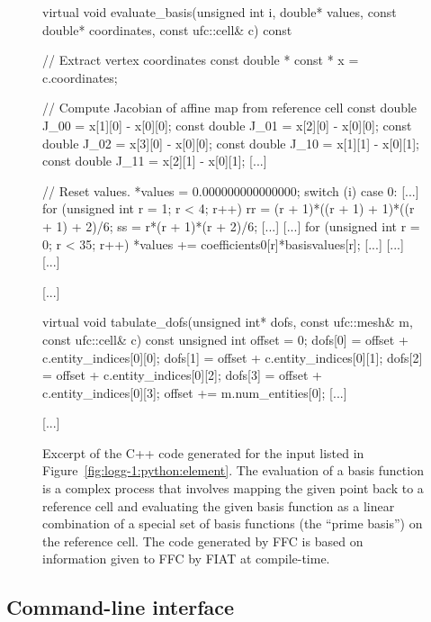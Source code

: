 \begin{figure}
  \begin{c++}
virtual void evaluate_basis(unsigned int i,
                            double* values,
                            const double* coordinates,
                            const ufc::cell& c) const
{
  // Extract vertex coordinates
  const double * const * x = c.coordinates;

  // Compute Jacobian of affine map from reference cell
  const double J_00 = x[1][0] - x[0][0];
  const double J_01 = x[2][0] - x[0][0];
  const double J_02 = x[3][0] - x[0][0];
  const double J_10 = x[1][1] - x[0][1];
  const double J_11 = x[2][1] - x[0][1];
  [...]

  // Reset values.
  *values = 0.000000000000000;
  switch (i)
  {
  case 0:
    {
      [...]
      for (unsigned int r = 1; r < 4; r++)
      {
        rr = (r + 1)*((r + 1) + 1)*((r + 1) + 2)/6;
        ss = r*(r + 1)*(r + 2)/6;
        [...]
      }
      [...]
      for (unsigned int r = 0; r < 35; r++)
      {
        *values += coefficients0[r]*basisvalues[r];
      }
      [...]
    }
  [...]
  }
  [...]
}

[...]

virtual void tabulate_dofs(unsigned int* dofs,
                           const ufc::mesh& m,
                           const ufc::cell& c) const
{
  unsigned int offset = 0;
  dofs[0] = offset + c.entity_indices[0][0];
  dofs[1] = offset + c.entity_indices[0][1];
  dofs[2] = offset + c.entity_indices[0][2];
  dofs[3] = offset + c.entity_indices[0][3];
  offset += m.num_entities[0];
  [...]
}

[...]
  \end{c++}
  \caption{Excerpt of the C++ code generated for the input listed in
    Figure~\ref{fig:logg-1:python:element}. The evaluation of a basis
    function is a complex process that involves mapping the given
    point back to a reference cell and evaluating the given basis
    function as a linear combination of a special set of basis
    functions (the ``prime basis'') on the reference cell. The code
    generated by FFC is based on information given to FFC by FIAT at
    compile-time.}
  \label{fig:logg-1:elementcode}
\end{figure}

\subsection{Command-line interface}

